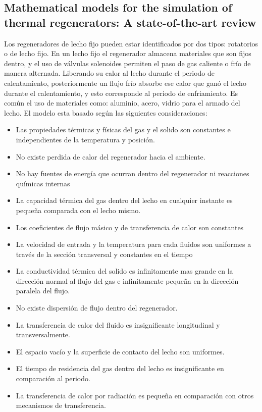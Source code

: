 \documentclass[12pt,letterpaper,final]{article}%
\begin{document}
\subsection*{Mathematical models for the simulation of thermal regenerators:
	A state-of-the-art review}
Los regeneradores de lecho fijo pueden estar identificados por dos tipos: rotatorios o de lecho fijo. En un lecho fijo el regenerador almacena materiales que son fijos dentro, y el uso de válvulas solenoides permiten el paso de gas caliente o frío de manera alternada. Liberando su calor al lecho durante el periodo de calentamiento, posteriormente un flujo frío absorbe ese calor que ganó el lecho durante el calentamiento, y esto corresponde al periodo de enfriamiento. Es común el uso de materiales como: aluminio, acero, vidrio para el armado del lecho\cite{SADRAMELI2016}.
\newline
El modelo esta basado según las siguientes consideraciones:
\begin{itemize}
	\item Las propiedades térmicas y físicas del gas y el solido son constantes e independientes de la temperatura y posición.
	\item No existe perdida de calor del regenerador hacia el ambiente.
	\item No hay fuentes de energía que ocurran dentro del regenerador ni reacciones químicas internas
	\item La capacidad térmica del gas dentro del lecho en cualquier instante es pequeña comparada con el lecho mismo.
	\item Los coeficientes de flujo másico y de transferencia de calor son constantes
	\item La velocidad de entrada y la temperatura para cada fluidos son uniformes a través de la sección transversal y constantes en el tiempo
	\item La conductividad térmica del solido es infinitamente mas grande en la dirección normal al flujo del gas e infinitamente pequeña en la dirección paralela del flujo.
	\item No existe dispersión de flujo dentro del regenerador.
	\item La transferencia de calor del fluido es insignificante longitudinal y transversalmente.
	\item El espacio vacío y la superficie de contacto del lecho son uniformes.
	\item El tiempo de residencia del gas dentro del lecho es insignificante en comparación al periodo.
	\item La transferencia de calor por radiación es pequeña en comparación con otros mecanismos de transferencia.
\end{itemize}
\end{document}

